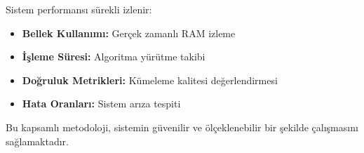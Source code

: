 Sistem performansı sürekli izlenir:

\begin{itemize}
    \item \textbf{Bellek Kullanımı:} Gerçek zamanlı RAM izleme
    \item \textbf{İşleme Süresi:} Algoritma yürütme takibi
    \item \textbf{Doğruluk Metrikleri:} Kümeleme kalitesi değerlendirmesi
    \item \textbf{Hata Oranları:} Sistem arıza tespiti
\end{itemize}

Bu kapsamlı metodoloji, sistemin güvenilir ve ölçeklenebilir bir şekilde çalışmasını sağlamaktadır.











